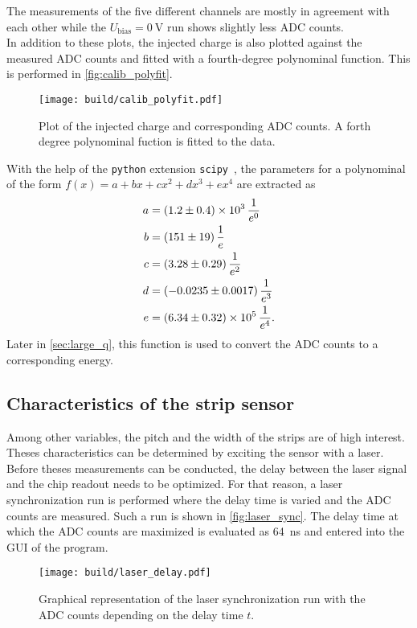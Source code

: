 The measurements of the five different channels are mostly in agreement with each other while the $U_{\mathrm{bias}}=\qty{0}{\volt}$ run shows slightly
less ADC counts. \\
In addition to these plots, the injected charge is also plotted against the measured ADC counts and fitted with a fourth-degree polynominal 
function. This is performed in \autoref{fig:calib_polyfit}. 
\begin{figure}
    \centering
    \texttt{[image: build/calib\_polyfit.pdf]}
    \caption{Plot of the injected charge and corresponding ADC counts. A forth degree polynominal fuction is fitted to the data.}
    \label{fig:calib_polyfit}
\end{figure}
With the help of the \texttt{python} extension \texttt{scipy}~\cite{scipy}, the parameters for
a polynominal of the form $f(x) = a + bx + cx^2 + dx^3 + ex^4$ are extracted as
\begin{align*}
    a &= \qty{1.2(0.4)e3}{\per\raiseto{0}\elementarycharge} \\
    b &= \qty{151+-19}{\per\raiseto{1}\elementarycharge} \\
    c &= \qty{3.28+-0.29}{\per\raiseto{2}\elementarycharge} \\
    d &= \qty{-0.0235+-0.0017}{\per\raiseto{3}\elementarycharge} \\
    e &= \qty{6.34(0.32)e5}{\per\raiseto{4}\elementarycharge}. \\
\end{align*} 
Later in \autoref{sec:large_q}, this function is used to convert the ADC counts to a corresponding energy.

\subsection{Characteristics of the strip sensor}
\label{sec:characteristics_strip_sensor}
Among other variables, the pitch and the width of the strips are of high interest. Theses characteristics can be determined by exciting the sensor with a laser.
Before theses measurements can be conducted, the delay between the laser signal and the chip readout needs to be optimized. For that reason, a laser synchronization
run is performed where the delay time is varied and the ADC counts are measured. Such a run is shown in \autoref{fig:laser_sync}. The delay time at which the ADC
counts are maximized is evaluated as \qty{64}{\nano\second} and entered into the GUI of the program.
\begin{figure}
    \centering
    \texttt{[image: build/laser\_delay.pdf]}
    \caption{Graphical representation of the laser synchronization run with the ADC counts depending on the delay time $t$.}
    \label{fig:laser_sync}
\end{figure}

